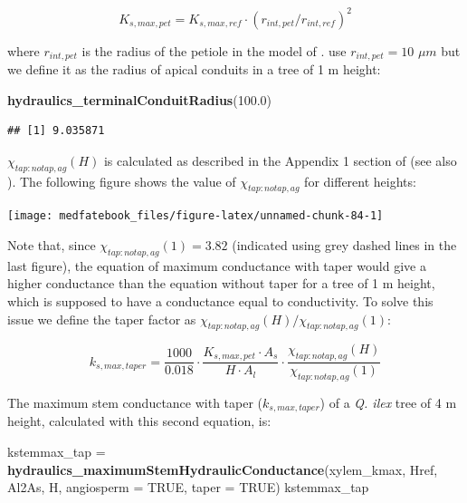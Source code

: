 \documentclass[]{book}
\newenvironment{Shaded}{\begin{snugshade}}{\end{snugshade}}
\newcommand{\KeywordTok}[1]{\textcolor[rgb]{0.13,0.29,0.53}{\textbf{#1}}}
\newcommand{\DataTypeTok}[1]{\textcolor[rgb]{0.13,0.29,0.53}{#1}}
\newcommand{\FloatTok}[1]{\textcolor[rgb]{0.00,0.00,0.81}{#1}}
\newcommand{\StringTok}[1]{\textcolor[rgb]{0.31,0.60,0.02}{#1}}
\newcommand{\OtherTok}[1]{\textcolor[rgb]{0.56,0.35,0.01}{#1}}
\newcommand{\NormalTok}[1]{#1}
\begin{document}
\begin{equation}
K_{s,max,pet} = K_{s,max,ref}\cdot (r_{int, pet}/r_{int,ref})^{2}
\end{equation}

where \(r_{int, pet}\) is the radius of the petiole in the model of
\citet{Savage2010}. \citet{Christoffersen2016} use \(r_{int, pet} = 10\)
\(\mu m\) but we define it as the radius of apical conduits in a tree of
1 m height:

\begin{Shaded}
\begin{Highlighting}[]
\KeywordTok{hydraulics_terminalConduitRadius}\NormalTok{(}\FloatTok{100.0}\NormalTok{)}
\end{Highlighting}
\end{Shaded}

\begin{verbatim}
## [1] 9.035871
\end{verbatim}

\(\chi_{tap:notap,ag}(H)\) is calculated as described in the Appendix 1
section of \citet{Christoffersen2016} (see also \citet{Savage2010}). The
following figure shows the value of \(\chi_{tap:notap,ag}\) for
different heights:

\begin{center}\texttt{[image: medfatebook\_files/figure-latex/unnamed-chunk-84-1]} \end{center}

Note that, since \(\chi_{tap:notap,ag}(1) = 3.82\) (indicated using grey
dashed lines in the last figure), the equation of maximum conductance
with taper would give a higher conductance than the equation without
taper for a tree of 1 m height, which is supposed to have a conductance
equal to conductivity. To solve this issue we define the taper factor as
\(\chi_{tap:notap,ag}(H)/\chi_{tap:notap,ag}(1)\):

\begin{equation}
k_{s, max, taper}=\frac{1000}{0.018} \cdot \frac{K_{s,max,pet}\cdot A_{s}}{H\cdot A_{l}}\cdot \frac{\chi_{tap:notap,ag}(H)}{\chi_{tap:notap,ag}(1)}
\end{equation}

The maximum stem conductance with taper (\(k_{s, max, taper}\)) of a
\emph{Q. ilex} tree of 4 m height, calculated with this second equation,
is:

\begin{Shaded}
\begin{Highlighting}[]
\NormalTok{kstemmax_tap =}\StringTok{ }\KeywordTok{hydraulics_maximumStemHydraulicConductance}\NormalTok{(xylem_kmax, }
\NormalTok{                      Href, Al2As, H, }\DataTypeTok{angiosperm =} \OtherTok{TRUE}\NormalTok{, }\DataTypeTok{taper =} \OtherTok{TRUE}\NormalTok{)}
\NormalTok{kstemmax_tap}
\end{Highlighting}
\end{Shaded}
\end{document}
